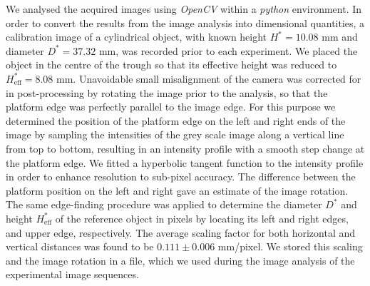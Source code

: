 \documentclass[aip,graphicx]{revtex4-1}
\newcommand{\sym}[1]{\text{#1}}
\begin{document}
We analysed the acquired images using \textit{OpenCV} \cite{bradski2008learning} within a \textit{python} environment. 
In order to convert the results from the image analysis into dimensional quantities, a calibration image of a cylindrical object, with known height $H^*=10.08$ mm and diameter $D^*=37.32$ mm, was recorded prior to each experiment. We placed the object in the centre of the trough so that its effective height was reduced to $H^*_{\sym{eff}}=8.08$ mm.
Unavoidable small misalignment of the camera was corrected for in post-processing by rotating the image prior to the analysis, so that the platform edge was perfectly parallel to the image edge. For this purpose we determined the position of the platform edge on the left and right ends of the image by sampling the intensities of the grey scale image along a vertical line from top to bottom, resulting in an intensity profile with a smooth step change at the platform edge. We fitted a hyperbolic tangent function to the intensity profile in order to enhance resolution to sub-pixel accuracy. The difference between the platform position on the left and right gave an estimate of the image rotation. The same edge-finding procedure was applied to determine the diameter $D^*$  and height $H^*_{\sym{eff}}$ of the reference object  in pixels by locating its left and right  edges, and upper edge, respectively. 
The average scaling factor for both horizontal and vertical distances was found to be $0.111 \pm 0.006$ mm/pixel.
We stored this scaling and the image rotation in a file, which we used during the image analysis of the experimental image sequences. 
\end{document}
